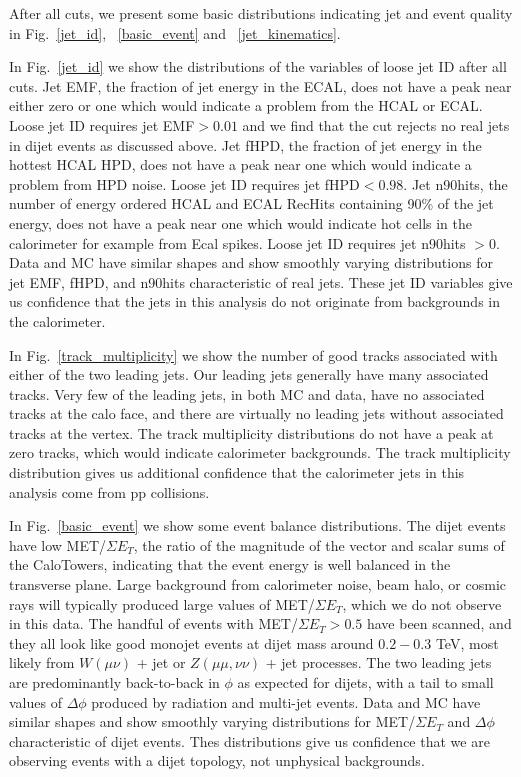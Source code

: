 After all cuts, we present some basic distributions indicating jet and event quality in 
Fig.~\ref{jet_id}, ~\ref{basic_event} and ~\ref{jet_kinematics}.


In Fig.~\ref{jet_id} we show the distributions of the variables of loose jet ID
after all cuts.  Jet EMF, the fraction 
of jet energy in the ECAL, does not have a peak near either zero or one which would indicate a 
problem from the
HCAL or ECAL. Loose jet ID requires jet EMF$ > 0.01$ and we find
that the cut rejects no real jets in dijet events as discussed above. Jet fHPD, the fraction of jet energy in 
the hottest HCAL HPD, does not have a peak near one which would indicate a problem from 
HPD noise.  Loose jet ID requires
jet fHPD$ < 0.98$.  Jet n90hits, the number of energy ordered HCAL and ECAL RecHits 
containing 90\% of the jet energy, does not have a peak near one which would indicate 
hot cells in the calorimeter for example from Ecal spikes.
Loose jet ID requires jet n90hits $> 0$.  Data and MC have
similar shapes and show smoothly 
varying distributions for jet EMF, fHPD, and n90hits 
characteristic of real jets.  These jet ID variables give us confidence 
that the jets in this analysis do not originate from backgrounds in the calorimeter.

In Fig.~\ref{track_multiplicity} we show the number of good tracks 
associated with either of the two leading jets.  Our leading jets generally have many 
associated tracks.  Very few of the leading jets, in both MC and data, have no 
associated tracks at the calo face, and there are virtually no leading jets without associated
tracks at the vertex. The track multiplicity distributions do not have a peak at zero tracks,
which would indicate calorimeter backgrounds.  The track multiplicity distribution gives 
us additional confidence that the calorimeter jets in this analysis come from pp collisions.

In Fig.~\ref{basic_event} we show some event balance distributions.  
The dijet events have low MET/$\Sigma E_T$,
the ratio of the magnitude of the vector and scalar sums of the CaloTowers,
indicating that the event energy is well balanced in the transverse plane. 
Large background from calorimeter noise, beam halo, or cosmic rays will typically
produced large values of MET/$\Sigma E_T$, which we do not observe in this data.
The handful of events with MET/$\Sigma E_T>0.5$ have been scanned, and they all look like good 
monojet events at dijet mass around $0.2-0.3$ TeV, most likely from 
$W(\mu \nu)$ + jet or $Z(\mu\mu, \nu\nu)$ + jet processes.
The two leading jets are predominantly back-to-back in $\phi$ as expected for 
dijets, with a tail to small values of $\Delta\phi$ produced by radiation 
and multi-jet events. 
Data and MC have similar shapes and show 
smoothly varying distributions for  MET/$\Sigma E_T$ and $\Delta\phi$ 
characteristic of dijet events. Thes distributions give us confidence
that we are observing events with a dijet topology, not unphysical backgrounds.


